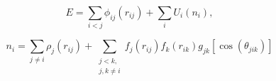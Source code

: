 \documentclass[12pt]{article}
\begin{document}
$$
   E=\sum_{i<j}\phi_{ij}(r_{ij})+\sum_{i}U_i(n_{i}),
$$

$$
   n_{i}=\sum_{j\ne i}\rho_j(r_{ij})+\sum_{\substack{j<k,\\j,k\neq i}}f_{j}(r_{ij})f_{k}(r_{ik})g_{jk}[\cos(\theta_{jik})]
$$
\end{document}
